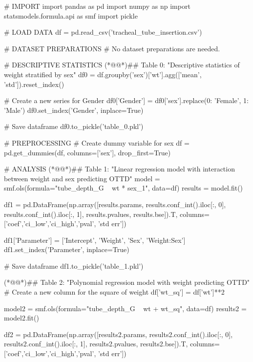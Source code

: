 \documentclass[11pt]{article}
\begin{document}
\begin{python}

# IMPORT
import pandas as pd
import numpy as np
import statsmodels.formula.api as smf
import pickle

# LOAD DATA
df = pd.read_csv('tracheal_tube_insertion.csv')

# DATASET PREPARATIONS
# No dataset preparations are needed.

# DESCRIPTIVE STATISTICS
(*@@*)## Table 0: "Descriptive statistics of weight stratified by sex"
df0 = df.groupby('sex')['wt'].agg(['mean', 'std']).reset_index()

# Create a new series for Gender
df0['Gender'] = df0['sex'].replace({0: 'Female', 1: 'Male'})
df0.set_index('Gender', inplace=True)

# Save dataframe
df0.to_pickle('table_0.pkl')

# PREPROCESSING
# Create dummy variable for sex
df = pd.get_dummies(df, columns=['sex'], drop_first=True)

# ANALYSIS
(*@@*)## Table 1: "Linear regression model with interaction between weight and sex predicting OTTD"
model = smf.ols(formula="tube_depth_G ~ wt * sex_1", data=df)
results = model.fit()

df1 = pd.DataFrame(np.array([results.params, results.conf_int().iloc[:, 0], 
                             results.conf_int().iloc[:, 1], results.pvalues, results.bse]).T,
                   columns=['coef','ci_low','ci_high','pval', 'std err'])

df1['Parameter'] = ['Intercept', 'Weight', 'Sex', 'Weight:Sex']
df1.set_index('Parameter', inplace=True)

# Save dataframe
df1.to_pickle('table_1.pkl')

(*@@*)## Table 2: "Polynomial regression model with weight predicting OTTD"
# Create a new column for the square of weight
df['wt_sq'] = df['wt']**2

model2 = smf.ols(formula="tube_depth_G ~ wt + wt_sq", data=df)
results2 = model2.fit()

df2 = pd.DataFrame(np.array([results2.params, results2.conf_int().iloc[:, 0], 
                              results2.conf_int().iloc[:, 1], results2.pvalues, results2.bse]).T,
                    columns=['coef','ci_low','ci_high','pval', 'std err'])


\end{python}
\end{document}
